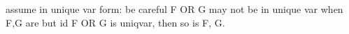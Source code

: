 
assume in unique var form: be careful  F OR G may not be in unique var when F,G are
but id F OR G is uniqvar, then so is F, G.
